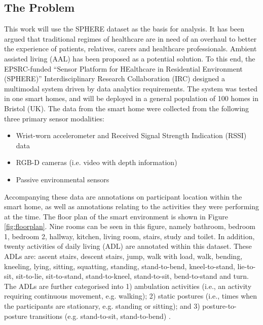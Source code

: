 \documentclass[fleqn,10pt]{SelfArx} %
\begin{document}
	\subsection{The Problem}
This work will use the SPHERE dataset as the basis for analysis. It has been argued that traditional regimes of healthcare are in need of an overhaul to better the experience of patients, relatives, carers and healthcare professionals. Ambient assisted living (AAL) has been proposed as a potential solution. To this end, the EPSRC-funded “Sensor Platform for HEalthcare in Residential Environment (SPHERE)” Interdisciplinary Research Collaboration (IRC) \cite{sphere2015} designed a multimodal system driven by data analytics requirements. The system was tested in one smart homes, and will be deployed in a general population of 100 homes in Bristol (UK). The data from the smart home were collected from the following three primary sensor modalities:
\begin{itemize}
\item Wrist-worn accelerometer and Received Signal Strength Indication (RSSI) data
\item RGB-D cameras (i.e. video with depth information)
\item Passive environmental sensors
\end{itemize}
Accompanying these data are annotations on participant location within the smart home, as well as annotations relating to the activities they were performing at the time. The floor plan of the smart environment is shown in Figure \ref{fig:floorplan}. Nine rooms can be seen in this figure, namely bathroom, bedroom 1, bedroom 2, hallway, kitchen, living room, stairs, study and toilet. In addition, twenty activities of daily living (ADL) are annotated within this dataset. These ADLs are: ascent stairs, descent stairs, jump, walk with load, walk, bending, kneeling, lying, sitting, squatting, standing, stand-to-bend, kneel-to-stand, lie-to-sit, sit-to-lie, sit-to-stand, stand-to-kneel, stand-to-sit, bend-to-stand and turn. The ADLs are further categorised into 1) ambulation activities (i.e., an activity requiring continuous movement, e.g. walking); 2) static postures (i.e., times when the participants are stationary, e.g. standing or sitting); and 3) posture-to-posture transitions (e.g. stand-to-sit, stand-to-bend) \cite{sphere2017}.  \\
\end{document}
